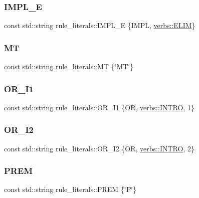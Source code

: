 \subsubsection{\texorpdfstring{I\+M\+P\+L\+\_\+E}{IMPL\_E}}
{\footnotesize\ttfamily const std\+::string rule\+\_\+literals\+::\+I\+M\+P\+L\+\_\+E \{I\+M\+PL, \hyperlink{namespaceverbs_ae28355cc9321ebee9abcd23bb6e1b836}{verbs\+::\+E\+L\+IM}\}}

\mbox{\label{namespacerule__literals_a056c3d0c0b701c07f444b7c5adfa8ff4}} 
\subsubsection{\texorpdfstring{MT}{MT}}
{\footnotesize\ttfamily const std\+::string rule\+\_\+literals\+::\+MT \{\char`\"{}MT\char`\"{}\}}

\mbox{\label{namespacerule__literals_a0c61940a6e12e4ea3a41346b5b3c5870}} 
\subsubsection{\texorpdfstring{O\+R\+\_\+\+I1}{OR\_I1}}
{\footnotesize\ttfamily const std\+::string rule\+\_\+literals\+::\+O\+R\+\_\+\+I1 \{OR, \hyperlink{namespaceverbs_a160cd2b49b96eb11b6db907bf94b5c3a}{verbs\+::\+I\+N\+T\+RO}, \textquotesingle{}1\textquotesingle{}\}}

\mbox{\label{namespacerule__literals_a2c1ef10ddec67801c44ea5b3e15ed133}} 
\subsubsection{\texorpdfstring{O\+R\+\_\+\+I2}{OR\_I2}}
{\footnotesize\ttfamily const std\+::string rule\+\_\+literals\+::\+O\+R\+\_\+\+I2 \{OR, \hyperlink{namespaceverbs_a160cd2b49b96eb11b6db907bf94b5c3a}{verbs\+::\+I\+N\+T\+RO}, \textquotesingle{}2\textquotesingle{}\}}

\mbox{\label{namespacerule__literals_a28f9829b438b28638be8c82c450237e1}} 
\subsubsection{\texorpdfstring{P\+R\+EM}{PREM}}
{\footnotesize\ttfamily const std\+::string rule\+\_\+literals\+::\+P\+R\+EM \{\char`\"{}P\char`\"{}\}}


